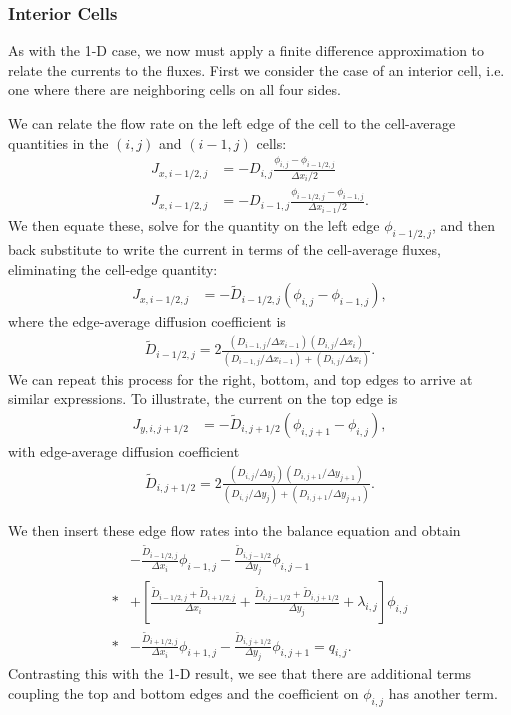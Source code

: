 \subsubsection{Interior Cells}

As with the 1-D case, we now must apply a finite difference approximation to relate the currents to the fluxes. First we consider the case of an interior cell, i.e. one where there are neighboring cells on all four sides.

We can relate the flow rate on the left edge of the cell to the cell-average quantities in the $(i,j)$ and $(i-1,j)$ cells:
\begin{align}
  J_{x,i-1/2,j} &= -D_{i,j} \frac{ \phi_{i,j} - \phi_{i-1/2,j} }{ \Delta x_i / 2 } \\
  J_{x,i-1/2,j} &= -D_{i-1,j} \frac{ \phi_{i-1/2,j} - \phi_{i-1,j} }{ \Delta x_{i-1} / 2 } .  
\end{align}
We then equate these, solve for the quantity on the left edge $\phi_{i-1/2,j}$, and then back substitute to write the current in terms of the cell-average fluxes, eliminating the cell-edge quantity:
\begin{align}
  J_{x,i-1/2,j} &= -\widetilde{D}_{i-1/2,j} \left( \phi_{i,j} - \phi_{i-1,j} \right) ,
\end{align}
where the edge-average diffusion coefficient is
\begin{align}
  \widetilde{D}_{i-1/2,j} = 2 \frac{ ( D_{i-1,j} / \Delta x_{i-1} ) ( D_{i,j} / \Delta x_{i} ) }{ ( D_{i-1,j} / \Delta x_{i-1} )  + ( D_{i,j} / \Delta x_{i} )  } .
\end{align}
We can repeat this process for the right, bottom, and top edges to arrive at similar expressions. To illustrate, the current on the top edge is
\begin{align}
  J_{y,i,j+1/2} &= -\widetilde{D}_{i,j+1/2} \left( \phi_{i,j+1} - \phi_{i,j} \right) ,
\end{align}
with edge-average diffusion coefficient
\begin{align}
  \widetilde{D}_{i,j+1/2} = 2 \frac{ ( D_{i,j} / \Delta y_j ) ( D_{i,j+1} / \Delta y_{j+1} ) }{ ( D_{i,j} / \Delta y_{j} )  + ( D_{i,j+1} / \Delta y_{j+1} )  } .
\end{align}

We then insert these edge flow rates into the balance equation and obtain
\begin{align}
  &- \frac{\widetilde{D}_{i-1/2,j}}{\Delta x_i} \phi_{i-1,j} -  \frac{\widetilde{D}_{i,j-1/2}}{\Delta y_j} \phi_{i,j-1} \nonumber \\*
  &+ \left[ \frac{ \widetilde{D}_{i-1/2,j} + \widetilde{D}_{i+1/2,j} }{ \Delta x_i } + \frac{ \widetilde{D}_{i,j-1/2} + \widetilde{D}_{i,j+1/2} }{ \Delta y_j } + \lambda_{i,j}  \right] \phi_{i,j} \nonumber \\*
  &- \frac{\widetilde{D}_{i+1/2,j}}{\Delta x_i} \phi_{i+1,j} -  \frac{\widetilde{D}_{i,j+1/2}}{\Delta y_j} \phi_{i,j+1} = q_{i,j} . \label{Eq:pde_finiteDifference_2DDiffusionEquation}
\end{align}
Contrasting this with the 1-D result, we see that there are additional terms coupling the top and bottom edges and the coefficient on $\phi_{i,j}$ has another term.

